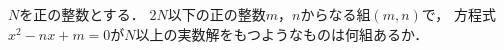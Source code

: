 \documentclass[../../main.tex]{subfiles}
\begin{document}
$N$を正の整数とする．
$2N$以下の正の整数$m$，$n$からなる組$(m,n)$で，
方程式$x^2-nx+m=0$が$N$以上の実数解をもつようなものは何組あるか．
\end{document}
